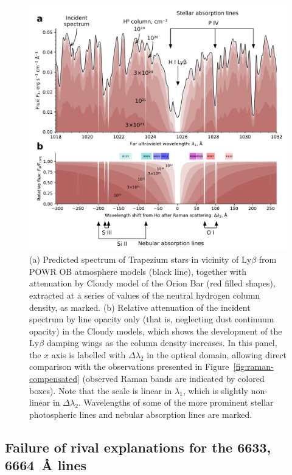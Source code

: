 \documentclass[useAMS, usenatbib, a4paper]{mnras}
\newcommand\lyb{\ensuremath{\text{Ly}\beta}}
\begin{document}
\begin{figure}
  \includegraphics[width=\linewidth]{figs/stellar-spectrum-fuv}
  \caption{(a) Predicted spectrum of Trapezium stars in vicinity of
    \lyb{} from POWR OB atmosphere models (black line), together with
    attenuation by Cloudy model of the Orion Bar (red filled shapes),
    extracted at a series of values of the neutral hydrogen column
    density, as marked. (b) Relative attenuation of the incident
    spectrum by line opacity only (that is, neglecting dust continuum
    opacity) in the Cloudy models, which shows the development of the
    \lyb{} damping wings as the column density increases.  In this
    panel, the \(x\) axis is labelled with \(\Delta\lambda_2\) in the optical
    domain, allowing direct comparison with the observations presented
    in Figure~\ref{fig:raman-compensated} (observed Raman bands are
    indicated by colored boxes). Note that the scale is linear in
    \(\lambda_1\), which is slightly non-linear in
    \(\Delta\lambda_2\).  Wavelengths of some of the more prominent stellar
    photospheric lines and nebular absorption lines are marked. }
  \label{fig:stellar-spectrum-fuv}
\end{figure}



\subsection{Failure of rival explanations for the 6633, 6664~\AA{} lines}
\label{sec:rival-expl-6633}
\end{document}
